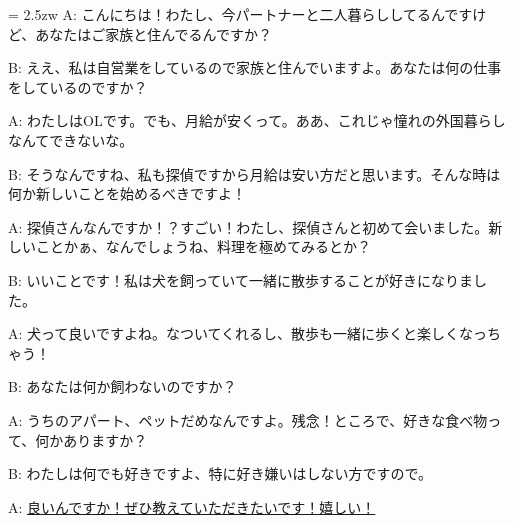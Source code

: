 \documentclass[11pt]{amsart}
\title{}
\author{}
\newenvironment{hangall}[1]{\hangindent = 2.5zw\everypar{\hangindent = 2.5zw}}{}
\begin{document}
\maketitle
\begin{hangall}{}%
A: こんにちは！わたし、今パートナーと二人暮らししてるんですけど、あなたはご家族と住んでるんですか？

B: ええ、私は自営業をしているので家族と住んでいますよ。あなたは何の仕事をしているのですか？

A: わたしはOLです。でも、月給が安くって。ああ、これじゃ憧れの外国暮らしなんてできないな。

B: そうなんですね、私も探偵ですから月給は安い方だと思います。そんな時は何か新しいことを始めるべきですよ！

A: 探偵さんなんですか！？すごい！わたし、探偵さんと初めて会いました。新しいことかぁ、なんでしょうね、料理を極めてみるとか？

B: いいことです！私は犬を飼っていて一緒に散歩することが好きになりました。

A: 犬って良いですよね。なついてくれるし、散歩も一緒に歩くと楽しくなっちゃう！

B: あなたは何か飼わないのですか？

A: うちのアパート、ペットだめなんですよ。残念！ところで、好きな食べ物って、何かありますか？

B: わたしは何でも好きですよ、特に好き嫌いはしない方ですので。

A: \ul{良いんですか！ぜひ教えていただきたいです！嬉しい！}\end{hangall}
\end{document}
